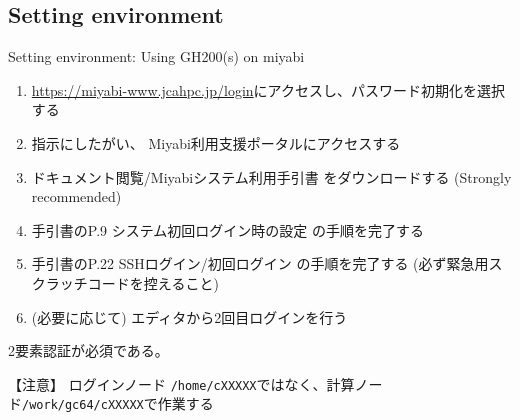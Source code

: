 \documentclass[dvipdfmx, 11pt, aspectratio=169]{beamer}   %
\begin{document}
\subsection{Setting environment}
\begin{frame}[fragile]{Setting environment: Using GH200(s) on miyabi}
  \begin{enumerate}
    \item \url{https://miyabi-www.jcahpc.jp/login}にアクセスし、パスワード初期化を選択する
    \item 指示にしたがい、 Miyabi利用支援ポータルにアクセスする
    \item ドキュメント閲覧/Miyabiシステム利用手引書 をダウンロードする (Strongly recommended)
    \item 手引書のP.9 システム初回ログイン時の設定 の手順を完了する
    \item 手引書のP.22 SSHログイン/初回ログイン の手順を完了する (必ず緊急用スクラッチコードを控えること)
    \item (必要に応じて) エディタから2回目ログインを行う
  \end{enumerate}
  2要素認証が必須である。

  【注意】 ログインノード \lstinline|/home/cXXXXX|ではなく、計算ノード\lstinline|/work/gc64/cXXXXX|で作業する
\end{frame}
\end{document}
